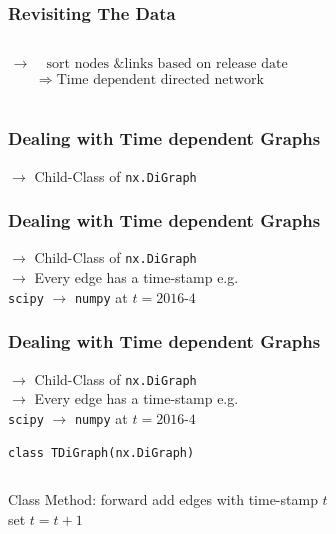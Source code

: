 \documentclass[fleqn]{beamer}
\begin{document}
    \begin{frame}
        \frametitle{Revisiting The Data}
        \begin{columns}[T]
        \begin{align*}
            \to &\;\;\text{sort nodes \& links based on release date}\\
                &\Rightarrow\; \text{Time dependent directed network}
        \end{align*}
        \end{columns}
    \end{frame}

    \begin{frame}
        \frametitle{Dealing with Time dependent Graphs}
            \centering $\to$\;\; Child-Class of \texttt{nx.DiGraph}\\
            \vspace{4.2cm}
    \end{frame}

    \begin{frame}
        \frametitle{Dealing with Time dependent Graphs}
            \centering $\to$\;\; Child-Class of \texttt{nx.DiGraph}\\
            \centering $\to$\;\; Every edge has a time-stamp e.g.\\
            \vspace{0.5cm}
            \centering \hspace{0.5cm} \texttt{scipy} $\rightarrow$
            \texttt{numpy} at $t = \text{2016-4}$
            \vspace{3cm}
    \end{frame}

    \begin{frame}
        \frametitle{Dealing with Time dependent Graphs}
            \centering $\to$\;\; Child-Class of \texttt{nx.DiGraph}\\
            \centering $\to$\;\; Every edge has a time-stamp e.g.\\
            \vspace{0.5cm}
            \centering \hspace{0.5cm} \texttt{scipy} $\rightarrow$
            \texttt{numpy} at $t = \text{2016-4}$
            \vspace{1cm}

            \centering \texttt{class TDiGraph(nx.DiGraph)}
        \begin{columns}[T]
        \begin{block}{\centering Class Method: forward}
            \centering add edges with time-stamp $t$\\
            \centering set $t = t + 1$
        \end{block}
        \end{columns}
    \end{frame}
\end{document}

